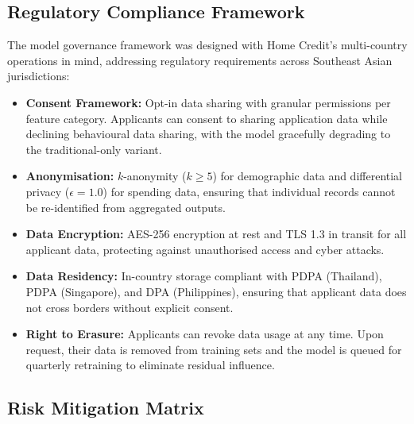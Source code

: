 \subsection{Regulatory Compliance Framework}

The model governance framework was designed with Home Credit's multi-country operations in mind, addressing regulatory requirements across Southeast Asian jurisdictions:

\begin{itemize}
    \item \textbf{Consent Framework:} Opt-in data sharing with granular permissions per feature category. Applicants can consent to sharing application data while declining behavioural data sharing, with the model gracefully degrading to the traditional-only variant.
    \item \textbf{Anonymisation:} $k$-anonymity ($k \geq 5$) for demographic data and differential privacy ($\epsilon = 1.0$) for spending data, ensuring that individual records cannot be re-identified from aggregated outputs.
    \item \textbf{Data Encryption:} AES-256 encryption at rest and TLS 1.3 in transit for all applicant data, protecting against unauthorised access and cyber attacks.
    \item \textbf{Data Residency:} In-country storage compliant with PDPA (Thailand), PDPA (Singapore), and DPA (Philippines), ensuring that applicant data does not cross borders without explicit consent.
    \item \textbf{Right to Erasure:} Applicants can revoke data usage at any time. Upon request, their data is removed from training sets and the model is queued for quarterly retraining to eliminate residual influence.
\end{itemize}

\subsection{Risk Mitigation Matrix}

